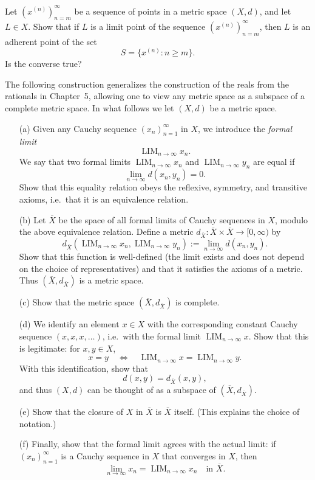 \begin{problem}
    Let $(x^{(n)})_{n=m}^\infty$ be a sequence of points in a metric space $(X,d)$, and let $L\in X$. Show that if $L$ is a limit point of the sequence $(x^{(n)})_{n=m}^\infty$, then $L$ is an adherent point of the set
\[
S = \{ x^{(n)} : n\ge m \}.
\]
Is the converse true?
\end{problem}

\begin{problem}
    The following construction generalizes the construction of the reals from the rationals in Chapter~5, allowing one to view any metric space as a subspace of a complete metric space. In what follows we let $(X,d)$ be a metric space.
\begin{enumerate}
  \item[(a)] Given any Cauchy sequence $(x_n)_{n=1}^\infty$ in $X$, we introduce the \emph{formal limit} 
  \[
  \operatorname{LIM}_{n\to\infty} x_n.
  \]
  We say that two formal limits $\operatorname{LIM}_{n\to\infty} x_n$ and $\operatorname{LIM}_{n\to\infty} y_n$ are equal if 
  \[
  \lim_{n\to\infty} d(x_n,y_n) = 0.
  \]
  Show that this equality relation obeys the reflexive, symmetry, and transitive axioms, i.e.\ that it is an equivalence relation.

  \item[(b)] Let $\overline{X}$ be the space of all formal limits of Cauchy sequences in $X$, modulo the above equivalence relation. Define a metric $d_{\overline{X}}:\overline{X}\times\overline{X}\to [0,\infty)$ by
  \[
  d_{\overline{X}}\!\left(\operatorname{LIM}_{n\to\infty}x_n, \operatorname{LIM}_{n\to\infty} y_n\right) := \lim_{n\to\infty} d(x_n,y_n).
  \]
  Show that this function is well-defined (the limit exists and does not depend on the choice of representatives) and that it satisfies the axioms of a metric. Thus $(\overline{X},d_{\overline{X}})$ is a metric space.

  \item[(c)] Show that the metric space $(\overline{X},d_{\overline{X}})$ is complete.

  \item[(d)] We identify an element $x\in X$ with the corresponding constant Cauchy sequence $(x,x,x,\dots)$, i.e.\ with the formal limit $\operatorname{LIM}_{n\to\infty} x$. Show that this is legitimate: for $x,y\in X$, 
  \[
  x=y \quad \Longleftrightarrow \quad \operatorname{LIM}_{n\to\infty} x = \operatorname{LIM}_{n\to\infty} y.
  \]
  With this identification, show that 
  \[
  d(x,y) = d_{\overline{X}}(x,y),
  \]
  and thus $(X,d)$ can be thought of as a subspace of $(\overline{X},d_{\overline{X}})$.

  \item[(e)] Show that the closure of $X$ in $\overline{X}$ is $\overline{X}$ itself. (This explains the choice of notation.)

  \item[(f)] Finally, show that the formal limit agrees with the actual limit: if $(x_n)_{n=1}^\infty$ is a Cauchy sequence in $X$ that converges in $X$, then
  \[
  \lim_{n\to\infty} x_n = \operatorname{LIM}_{n\to\infty} x_n \quad \text{in } \overline{X}.
  \]
\end{enumerate}
\end{problem}

